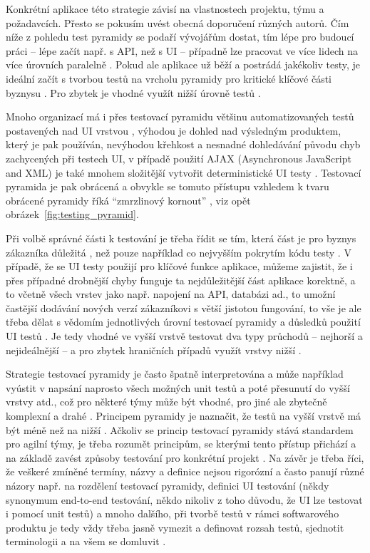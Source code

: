 Konkrétní aplikace této strategie závisí na vlastnostech projektu, týmu a požadavcích. Přesto se pokusím uvést obecná doporučení různých autorů. Čím níže z pohledu test pyramidy se podaří vývojářům dostat, tím lépe pro budoucí práci -- lépe začít např. s API, než s UI -- případně lze pracovat ve více lidech na více úrovních paralelně \cite{test-kitner}. Pokud ale aplikace už běží a postrádá jakékoliv testy, je ideální začít s tvorbou testů na vrcholu pyramidy pro kritické klíčové části byznysu \cite{test-atlassian}. Pro zbytek je vhodné využít nižší úrovně testů \cite{test-atlassian2}.

Mnoho organizací má i přes testovací pyramidu většinu automatizovaných testů postavených nad UI vrstvou \cite{test-devqa}, výhodou je dohled nad výsledným produktem, který je pak používán, nevýhodou křehkost a nesnadné dohledávání původu chyb zachycených při testech UI, v případě použití AJAX (Asynchronous JavaScript and XML) je také mnohem složitější vytvořit deterministické UI testy \cite{test-timothy}. Testovací pyramida je pak obrácená a obvykle se tomuto přístupu vzhledem k tvaru obrácené pyramidy říká \enquote{zmrzlinový kornout} \cite{test-mf1}, viz opět obrázek~\ref{fig:testing_pyramid}. 

Při volbě správné části k testování je třeba řídit se tím, která část je pro byznys zákazníka důležitá \cite{test-kitner}, než pouze například co nejvyšším pokrytím kódu testy \cite{test-devqa}. V případě, že se UI testy použijí pro klíčové funkce aplikace, můžeme zajistit, že i přes případné drobnější chyby funguje ta nejdůležitější část aplikace korektně, a to včetně všech vrstev jako např. napojení na API, databázi ad., to umožní častější dodávání nových verzí zákazníkovi s větší jistotou fungování, to vše je ale třeba dělat s vědomím jednotlivých úrovní testovací pyramidy a důsledků použití UI testů \cite{test-novanet}. Je tedy vhodné ve vyšší vrstvě testovat dva typy průchodů -- nejhorší a nejideálnější -- a pro zbytek hraničních případů využít vrstvy nižší \cite{test-dzone}.

Strategie testovací pyramidy je často špatně interpretována a může například vyústit v napsání naprosto všech možných unit testů a poté přesunutí do vyšší vrstvy atd., což pro některé týmy může být vhodné, pro jiné ale zbytečně komplexní a drahé \cite{test-cucumber2}. Principem pyramidy je naznačit, že testů na vyšší vrstvě má být méně než na nižší \cite{test-cucumber2}. Ačkoliv se princip testovací pyramidy stává standardem pro agilní týmy, je třeba rozumět principům, se kterými tento přístup přichází a na základě zavést způsoby testování pro konkrétní projekt \cite{test-cucumber2}. Na závěr je třeba říci, že veškeré zmíněné termíny, názvy a definice nejsou rigorózní a často panují různé názory např. na rozdělení testovací pyramidy, definici UI testování (někdy synonymum end-to-end testování, někdo nikoliv z toho důvodu, že UI lze testovat i pomocí unit testů) a mnoho dalšího, při tvorbě testů v rámci softwarového produktu je tedy vždy třeba jasně vymezit a definovat rozsah testů, sjednotit terminologii a na všem se domluvit \cite{test-fowler}.

